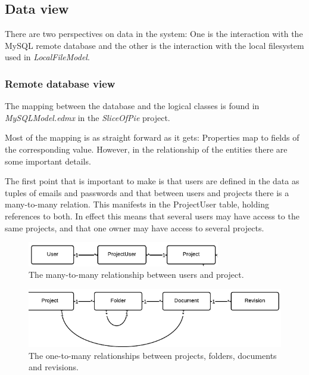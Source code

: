 \subsection{Data view}

There are two perspectives on data in the system: One is the interaction with the MySQL remote database
and the other is the interaction with the local filesystem used in \emph{LocalFileModel}.

\subsubsection{Remote database view}
The mapping between the database and the logical classes is found in \emph{MySQLModel.edmx} in the
\emph{SliceOfPie} project.

Most of the mapping is as straight forward as it gets: Properties map to fields of the corresponding value.
However, in the relationship of the entities there are some important details.

The first point that is important to make is that users are defined in the data as tuples of emails
and passwords and that between users and projects there is a many-to-many relation. This manifests
in the ProjectUser table, holding references to both. In effect this means that several users may 
have access to the same projects, and that one owner may have access to several projects.

\begin{figure}[htb]
	\centering
	\includegraphics[width=0.75\textwidth]{Software_architecture/graphics/db-user-project.png}
	\caption{The many-to-many relationship between users and project.}
	\label{fig:db-user-project}
\end{figure}

\begin{figure}[htb]
	\centering
	\includegraphics[width=1.0\textwidth]{Software_architecture/graphics/db-project-folder-document.png}
	\caption{The one-to-many relationships between projects, folders, documents and revisions.}
	\label{fig:db-project-folder-document}
\end{figure}

